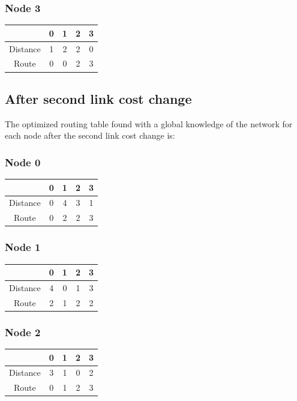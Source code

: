 \documentclass[a4paper,11pt,final]{report}
\begin{document}
\subsubsection{Node 3}

\begin{tabular}{|c|c|c|c|c|}
\hline
& 0 & 1 & 2 & 3 \\ \hline
Distance & 1 & 2 & 2 & 0 \\ \hline
Route & 0 & 0 & 2 & 3 \\ \hline
\end{tabular}

\subsection{After second link cost change}

The optimized routing table found with a global knowledge of the network
for each node after the second link cost change is:

\subsubsection{Node 0}

\begin{tabular}{|c|c|c|c|c|}
\hline
& 0 & 1 & 2 & 3 \\ \hline
Distance & 0 & 4 & 3 & 1 \\ \hline
Route & 0 & 2 & 2 & 3 \\ \hline
\end{tabular}

\subsubsection{Node 1}

\begin{tabular}{|c|c|c|c|c|}
\hline
& 0 & 1 & 2 & 3 \\ \hline
Distance & 4 & 0 & 1 & 3 \\ \hline
Route & 2 & 1 & 2 & 2 \\ \hline
\end{tabular}

\subsubsection{Node 2}

\begin{tabular}{|c|c|c|c|c|}
\hline
& 0 & 1 & 2 & 3 \\ \hline
Distance & 3 & 1 & 0 & 2 \\ \hline
Route & 0 & 1 & 2 & 3 \\ \hline
\end{tabular}
\end{document}
